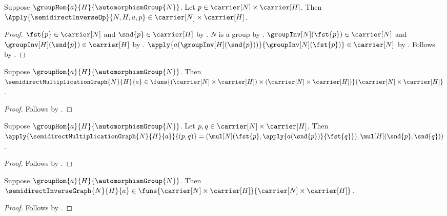 \begin{proposition}\label{semidirect_inverse_value_type}
    Suppose $\groupHom{a}{H}{\automorphismGroup{N}}$.
    Let $p\in\carrier[N]\times\carrier[H]$.
    Then
        $\Apply{\semidirectInverseOp}{N,H,a,p}
            \in\carrier[N]\times\carrier[H]$.
\end{proposition}
\begin{proof}
    $\fst{p}\in\carrier[N]$ and $\snd{p}\in\carrier[H]$ by
        .
    $N$ is a group by
        .
    $\groupInv[N](\fst{p})\in\carrier[N]$ and
        $\groupInv[H](\snd{p})\in\carrier[H]$ by
        .
    $\apply{a(\groupInv[H](\snd{p}))}
        {\groupInv[N](\fst{p})}\in\carrier[N]$ by
        .
    Follows by .
\end{proof}

\begin{proposition}\label{semidirect_multiplication_graph_type}
    Suppose $\groupHom{a}{H}{\automorphismGroup{N}}$.
    Then $\semidirectMultiplicationGraph{N}{H}{a}\in
        \funs{
            (\carrier[N]\times\carrier[H])\times
            (\carrier[N]\times\carrier[H])}
            {\carrier[N]\times\carrier[H]}$.
\end{proposition}
\begin{proof}
    Follows by
        .
\end{proof}

\begin{proposition}\label{semidirect_multiplication_graph_apply}
    Suppose $\groupHom{a}{H}{\automorphismGroup{N}}$.
    Let $p,q\in\carrier[N]\times\carrier[H]$.
    Then
        $\apply{\semidirectMultiplicationGraph{N}{H}{a}}{(p,q)}=
            (\mul[N](\fst{p},\apply{a(\snd{p})}{\fst{q}}),
             \mul[H](\snd{p},\snd{q}))$.
\end{proposition}
\begin{proof}
    Follows by
        .
\end{proof}

\begin{proposition}\label{semidirect_inverse_graph_type}
    Suppose $\groupHom{a}{H}{\automorphismGroup{N}}$.
    Then $\semidirectInverseGraph{N}{H}{a}\in
        \funs{\carrier[N]\times\carrier[H]}
            {\carrier[N]\times\carrier[H]}$.
\end{proposition}
\begin{proof}
    Follows by
        .
\end{proof}

